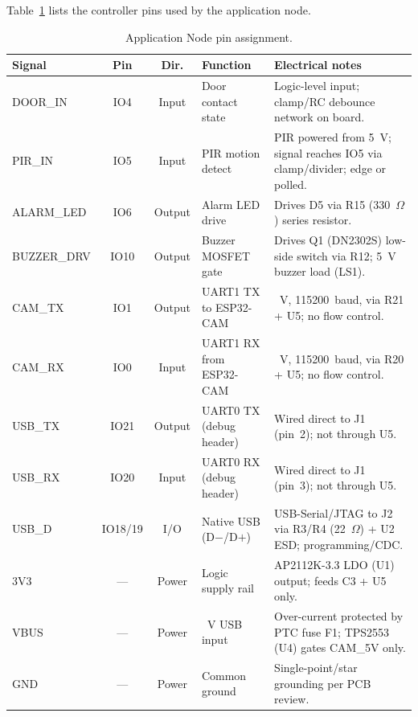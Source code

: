 \documentclass[11pt,a4paper]{article}
\begin{document}
Table~\ref{tab:pinout} lists the controller pins used by the application node.

\begin{table}[H]
    \centering
    \caption{Application Node pin assignment.}
    \label{tab:pinout}
    \begin{tabular}{>{\raggedright\arraybackslash}p{2.7cm} c c >{\raggedright\arraybackslash}p{2.2cm} >{\raggedright\arraybackslash}p{5.2cm}}
        \toprule
        \textbf{Signal} & \textbf{Pin} & \textbf{Dir.} & \textbf{Function} & \textbf{Electrical notes} \\
        \midrule
        DOOR\_IN & IO4 & Input & Door contact state & Logic-level input; clamp/RC debounce network on board. \\
        PIR\_IN & IO5 & Input & PIR motion detect & PIR powered from 5~V; signal reaches IO5 via clamp/divider; edge or polled. \\
        ALARM\_LED & IO6 & Output & Alarm LED drive & Drives D5 via R15 (330~$\Omega$) series resistor. \\
        BUZZER\_DRV & IO10 & Output & Buzzer MOSFET gate & Drives Q1 (DN2302S) low-side switch via R12; 5~V buzzer load (LS1). \\
        CAM\_TX & IO1 & Output & UART1 TX to ESP32-CAM & 3.3~V, 115200~baud, via R21 + U5; no flow control. \\
        CAM\_RX & IO0 & Input & UART1 RX from ESP32-CAM & 3.3~V, 115200~baud, via R20 + U5; no flow control. \\
        USB\_TX & IO21 & Output & UART0 TX (debug header) & Wired direct to J1 (pin~2); not through U5. \\
        USB\_RX & IO20 & Input & UART0 RX (debug header) & Wired direct to J1 (pin~3); not through U5. \\
        USB\_D & IO18/19 & I/O & Native USB (D$-$/D$+$) & USB-Serial/JTAG to J2 via R3/R4 (22~$\Omega$) + U2 ESD; programming/CDC. \\
        3V3 & --- & Power & Logic supply rail & AP2112K-3.3 LDO (U1) output; feeds C3 + U5 only. \\
        VBUS & --- & Power & 5~V USB input & Over-current protected by PTC fuse F1; TPS2553 (U4) gates CAM\_5V only. \\
        GND & --- & Power & Common ground & Single-point/star grounding per PCB review. \\
        \bottomrule
    \end{tabular}
\end{table}
\end{document}
